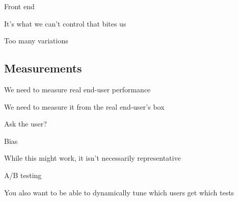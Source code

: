 \documentclass{beamer}
\begin{document}
\begin{frame}{Front end}
  \begin{center}
  It's what we can't control that bites us
  \end{center}
\end{frame}

\begin{frame}{Too many variations}
  \begin{center}
  \LARGE{
  }
  \end{center}
\end{frame}

\subsection{Measurements}

\begin{frame}{}
  \begin{center}
  We need to measure real end-user performance
  \end{center}
\end{frame}

\begin{frame}{}
  \begin{center}
  We need to measure it from the real end-user's box
  \end{center}
\end{frame}

\begin{frame}{Ask the user?}
  \begin{center}
  \end{center}
\end{frame}

\begin{frame}{Bias}
  \begin{center}
  While this might work, it isn't necessarily representative
  \end{center}
\end{frame}

\begin{frame}{A/B testing}
  \begin{center}
  You also want to be able to dynamically tune which users get which tests
  \end{center}
\end{frame}
\end{document}
